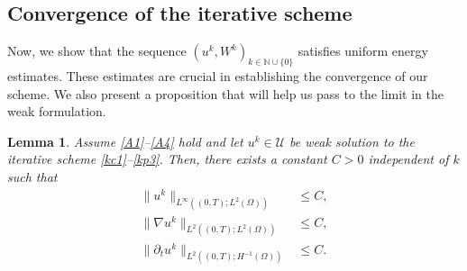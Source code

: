 \documentclass[11pt]{article}
\newtheorem{lemma}{Lemma}
\newcommand{\timeint}{(0,T)}
\begin{document}
\subsection{Convergence of the iterative scheme}
Now, we show that the sequence $(u^k,W^k)_{k\in \mathbb{N}\cup \{0\}}$ satisfies uniform energy estimates.
These estimates are crucial in establishing the convergence of our scheme. 
We also present a proposition that will help us pass to the limit in the weak formulation.
%
\begin{lemma}\label{L4}
  Assume \ref{A1}--\ref{A4} hold and 
  let $u^{k}\in \mathcal{U}$ be weak solution to the iterative scheme \eqref{kc1}--\eqref{kp3}.
  Then, there exists a constant $C>0$ independent of $k$ such that
 \begin{subequations}
    \begin{align}
    \|u^{k}\|_{L^{\infty}(\timeint;L^2(\Omega))}&\leq C,\label{T2e1}\\ 
    \|\nabla u^{k}\|_{L^{2}(\timeint;L^2(\Omega))}&\leq C,\label{T2e2}\\
    \|\partial_t u^{k}\|_{L^{2}(\timeint;H^{-1}(\Omega))}&\leq C\label{T2e3}.
    \end{align}
  \end{subequations}
\end{lemma}
\end{document}
